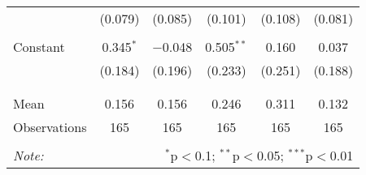 \begin{tabular}{@{\extracolsep{5pt}}lccccc}
  & (0.079) & (0.085) & (0.101) & (0.108) & (0.081) \\ 
  & & & & & \\ 
 Constant & 0.345$^{*}$ & $-$0.048 & 0.505$^{**}$ & 0.160 & 0.037 \\ 
  & (0.184) & (0.196) & (0.233) & (0.251) & (0.188) \\ 
  & & & & & \\ 
\hline \\[-1.8ex] 
Mean & 0.156 & 0.156 & 0.246 & 0.311 & 0.132 \\ 
Observations & 165 & 165 & 165 & 165 & 165 \\ 
\hline 
\hline \\[-1.8ex] 
\textit{Note:}  & \multicolumn{5}{r}{$^{*}$p$<$0.1; $^{**}$p$<$0.05; $^{***}$p$<$0.01} \\ 
\end{tabular} 
